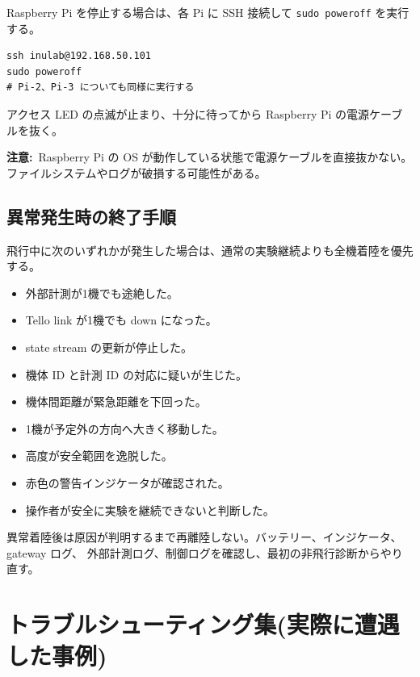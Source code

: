 \documentclass[11pt,a4paper]{ltjsarticle}
\newcommand{\code}[1]{\texttt{\small #1}}
\newcommand{\warning}[1]{\par\smallskip\noindent\textbf{注意:}~#1\par\smallskip}
\begin{document}
Raspberry Pi を停止する場合は、各 Pi に SSH 接続して \code{sudo poweroff} を実行する。

\begin{lstlisting}
ssh inulab@192.168.50.101
sudo poweroff
# Pi-2、Pi-3 についても同様に実行する
\end{lstlisting}

アクセス LED の点滅が止まり、十分に待ってから Raspberry Pi の電源ケーブルを抜く。

\warning{Raspberry Pi の OS が動作している状態で電源ケーブルを直接抜かない。ファイルシステムやログが破損する可能性がある。}

\subsection{異常発生時の終了手順}

飛行中に次のいずれかが発生した場合は、通常の実験継続よりも全機着陸を優先する。

\begin{itemize}[leftmargin=1.4em]
  \item 外部計測が1機でも途絶した。
  \item Tello link が1機でも down になった。
  \item state stream の更新が停止した。
  \item 機体 ID と計測 ID の対応に疑いが生じた。
  \item 機体間距離が緊急距離を下回った。
  \item 1機が予定外の方向へ大きく移動した。
  \item 高度が安全範囲を逸脱した。
  \item 赤色の警告インジケータが確認された。
  \item 操作者が安全に実験を継続できないと判断した。
\end{itemize}

異常着陸後は原因が判明するまで再離陸しない。バッテリー、インジケータ、gateway ログ、
外部計測ログ、制御ログを確認し、最初の非飛行診断からやり直す。

\section{トラブルシューティング集(実際に遭遇した事例)}\label{sec:trouble}
\end{document}
